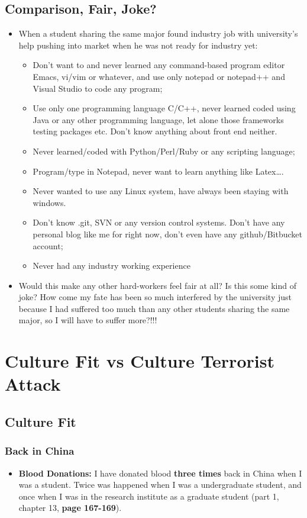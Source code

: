 \documentclass[9pt,b5paper]{article}
\begin{document}
\subsection{Comparison, Fair, Joke?}
\label{sec-11-1}
\begin{itemize}
\item When a student sharing the same major found industry job with university's help pushing into market when he was not ready for industry yet:
\begin{itemize}
\item Don't want to and never learned any command-based program editor Emacs, vi/vim or whatever, and use only notepad or notepad++ and Visual Studio to code any program;
\item Use only one programming language C/C++, never learned coded using Java or any other programming language, let alone those frameworks testing packages etc. Don't know anything about front end neither.
\item Never learned/coded with Python/Perl/Ruby or any scripting language;
\item Program/type in Notepad, never want to learn anything like Latex\ldots{}.
\item Never wanted to use any Linux system, have always been staying with windows.
\item Don't know .git, SVN or any version control systems. Don't have any personal blog like me for right now, don't even have any github/Bitbucket account;
\item Never had any industry working experience
\end{itemize}
\item Would this make any other hard-workers feel fair at all? Is this some kind of joke? How come my fate has been so much interfered by the university just because I had suffered too much than any other students sharing the same major, so I will have to suffer more?!!!
\end{itemize}

\section{Culture Fit vs Culture Terrorist Attack}
\label{sec-12}
\subsection{Culture Fit}
\label{sec-12-1}
\subsubsection{Back in China}
\label{sec-12-1-1}
\begin{itemize}
\item \textbf{Blood Donations:} I have donated blood \textbf{three times} back in China when I was a student. Twice was happened when I was a undergraduate student, and once when I was in the research institute as a graduate student (part 1, chapter 13, \textbf{page 167-169}).
\end{itemize}
\end{document}
